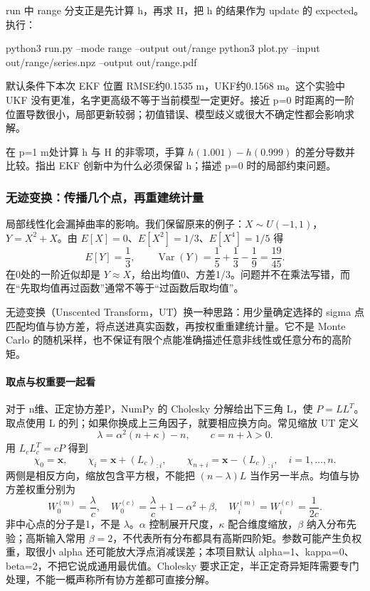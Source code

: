 \begin{example}
run 中 range 分支正是先计算 h，再求 H，把 h 的结果作为 update 的 expected。执行：
\begin{tbash}
python3 run.py --mode range --output out/range
python3 plot.py --input out/range/series.npz --output out/range.pdf
\end{tbash}
默认条件下本次 EKF 位置 RMSE约0.1535 m，UKF约0.1568 m。这个实验中 UKF 没有更准，名字更高级不等于当前模型一定更好。接近 p=0 时距离的一阶位置导数很小，局部更新较弱；初值错误、模型歧义或很大不确定性都会影响求解。
\end{example}
\begin{exercise}\label{ex:v2-filter-ekf}
在 p=1 m处计算 h 与 H 的非零项，手算 $h(1.001)-h(0.999)$ 的差分导数并比较。指出 EKF 创新中为什么必须保留 h；描述 p=0 时的局部约束问题。
\end{exercise}

\subsubsection{无迹变换：传播几个点，再重建统计量}
局部线性化会漏掉曲率的影响。我们保留原来的例子：$X\sim U(-1,1)$，$Y=X^2+X$。由 $E[X]=0$、$E[X^2]=1/3$、$E[X^4]=1/5$ 得
\[
E[Y]=\frac13,\qquad
\operatorname{Var}(Y)=\frac15+\frac13-\frac19=\frac{19}{45}.
\]
在0处的一阶近似却是 $Y\approx X$，给出均值0、方差1/3。问题并不在乘法写错，而在“先取均值再过函数”通常不等于“过函数后取均值”。

无迹变换（Unscented Transform，UT）换一种思路：用少量确定选择的 sigma 点匹配均值与协方差，将点送进真实函数，再按权重重建统计量。它不是 Monte Carlo 的随机采样，也不保证有限个点能准确描述任意非线性或任意分布的高阶矩。

\paragraph*{取点与权重要一起看}
对于 n维、正定协方差P，NumPy 的 Cholesky 分解给出下三角 L，使 $P=LL^T$。取点使用 L 的列；如果你换成上三角因子，就要相应换方向。常见缩放 UT 定义
\[
\lambda=\alpha^2(n+\kappa)-n,\qquad c=n+\lambda>0.
\]
用 $L_cL_c^T=cP$ 得到
\begin{equation}
\chi_0=\boldsymbol x,\qquad
\chi_i=\boldsymbol x+(L_c)_{:i},\qquad
\chi_{n+i}=\boldsymbol x-(L_c)_{:i},\quad i=1,\ldots,n.
\label{eq:sigma}
\end{equation}
两侧是相反方向，缩放包含平方根，不能把 $(n-\lambda)L$ 当作另一半点。均值与协方差权重分别为
\[
W_0^{(m)}=\frac{\lambda}{c},\quad
W_0^{(c)}=\frac{\lambda}{c}+1-\alpha^2+\beta,\quad
W_i^{(m)}=W_i^{(c)}=\frac1{2c}.
\]
非中心点的分子是1，不是 $\lambda$。$\alpha$ 控制展开尺度，$\kappa$ 配合维度缩放，$\beta$ 纳入分布先验；高斯输入常用 $\beta=2$，不代表所有分布都具有高斯四阶矩。参数可能产生负权重，取很小 alpha 还可能放大浮点消减误差；本项目默认 alpha=1、kappa=0、beta=2，不把它说成通用最优值。Cholesky 要求正定，半正定奇异矩阵需要专门处理，不能一概声称所有协方差都可直接分解。

